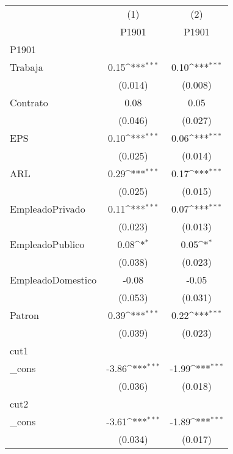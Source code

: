 {
\def\sym#1{\ifmmode^{#1}\else\(^{#1}\)\fi}
\begin{tabular}{l*{2}{c}}
\hline\hline
            &\multicolumn{1}{c}{(1)}&\multicolumn{1}{c}{(2)}\\
            &\multicolumn{1}{c}{P1901}&\multicolumn{1}{c}{P1901}\\
\hline
P1901       &                     &                     \\
Trabaja     &        0.15\sym{***}&        0.10\sym{***}\\
            &     (0.014)         &     (0.008)         \\
[1em]
Contrato    &        0.08         &        0.05         \\
            &     (0.046)         &     (0.027)         \\
[1em]
EPS         &        0.10\sym{***}&        0.06\sym{***}\\
            &     (0.025)         &     (0.014)         \\
[1em]
ARL         &        0.29\sym{***}&        0.17\sym{***}\\
            &     (0.025)         &     (0.015)         \\
[1em]
EmpleadoPrivado&        0.11\sym{***}&        0.07\sym{***}\\
            &     (0.023)         &     (0.013)         \\
[1em]
EmpleadoPublico&        0.08\sym{*}  &        0.05\sym{*}  \\
            &     (0.038)         &     (0.023)         \\
[1em]
EmpleadoDomestico&       -0.08         &       -0.05         \\
            &     (0.053)         &     (0.031)         \\
[1em]
Patron      &        0.39\sym{***}&        0.22\sym{***}\\
            &     (0.039)         &     (0.023)         \\
\hline
cut1        &                     &                     \\
\_cons      &       -3.86\sym{***}&       -1.99\sym{***}\\
            &     (0.036)         &     (0.018)         \\
\hline
cut2        &                     &                     \\
\_cons      &       -3.61\sym{***}&       -1.89\sym{***}\\
            &     (0.034)         &     (0.017)         \\

\end{tabular}}
